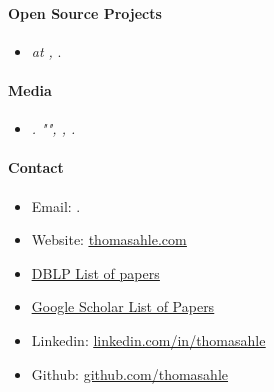\documentclass[11pt]{article}
\begin{document}
\paragraph{Open Source Projects}
\begin{itemize}
   \item[]
   \emph{ at , }.
   \\
\end{itemize}


\paragraph{Media}
\begin{itemize}
   \item[]
      \emph{.
         "", , .}
\end{itemize}

\paragraph{Contact}
\begin{itemize}
   \item[]
      Email: \href{mailto:\VAR{authors['thdy'].email}}{}.
   \item[]
      Website: \href{http://www.thomasahle.com}{\underline{thomasahle.com}}
   \item[]
      \href{https://dblp1.uni-trier.de/pers/hd/a/Ahle:Thomas_D=}{\underline{DBLP List of papers}}
   \item[]
      \href{https://scholar.google.dk/citations?user=aRiVoYgAAAAJ}{\underline{Google Scholar List of Papers}}
   \item[]
      Linkedin: \href{https://www.linkedin.com/in/thomasahle/}{\underline{linkedin.com/in/thomasahle}}
   \item[]
      Github: \href{https://github.com/thomasahle}{\underline{github.com/thomasahle}}
\end{itemize}
\end{document}

